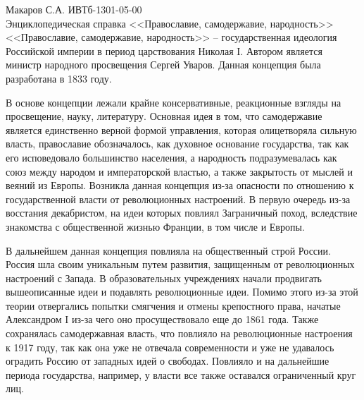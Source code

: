 \documentclass[a4paper,14pt]{extarticle}
\begin{document}
	\pagestyle{empty}
	\noindent Макаров С.А. ИВТб-1301-05-00\\
	Энциклопедическая справка <<Православие, самодержавие, народность>> \\
	
	<<Православие, самодержавие, народность>> -- государственная идеология Российской империи в период царствования Николая I. Автором является министр народного просвещения Сергей Уваров. Данная концепция была разработана в 1833 году.
	
	В основе концепции лежали крайне консервативные, реакционные взгляды на просвещение, науку, литературу. Основная идея в том, что самодержавие является единственно верной формой управления, которая олицетворяла сильную  власть, православие обозначалось, как духовное основание государства, так как его исповедовало большинство населения, а народность подразумевалась как союз между народом и императорской властью, а также закрытость от мыслей и веяний из Европы. Возникла данная концепция из-за опасности по отношению к государственной власти от революционных настроений. В первую очередь из-за восстания декабристом, на идеи которых повлиял Заграничный поход, вследствие знакомства с общественной жизнью Франции, в том числе и Европы.
	
	В дальнейшем данная концепция повлияла на общественный строй России. Россия шла своим уникальным путем развития, защищенным от революционных настроений с Запада. В образовательных учреждениях начали продвигать вышеописанные идеи и подавлять революционные идеи. Помимо этого из-за этой теории отвергались попытки смягчения и отмены крепостного права, начатые Александром I из-за чего оно просуществовало еще до 1861 года. Также сохранялась самодержавная власть, что повлияло на революционные настроения к 1917 году, так как она уже не отвечала современности и уже не удавалось оградить Россию от западных идей о свободах. Повлияло и на дальнейшие периода государства, например, у власти все также оставался ограниченный круг лиц.
\end{document}
